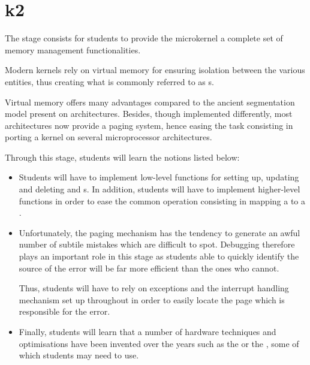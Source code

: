 %
%
%
%
%
%

%
%

\chapter{k2}
\label{chapter:k2}

The  stage consists for students to provide the microkernel a
complete set of memory management functionalities.

Modern kernels rely on virtual memory for ensuring isolation between the
various entities, thus creating what is commonly referred to as
s.

Virtual memory offers many advantages compared to the ancient segmentation
model present on  architectures. Besides, though implemented
differently, most architectures now provide a paging system, hence easing
the task consisting in porting a kernel on several microprocessor
architectures.

Through this stage, students will learn the notions listed below:

\begin{itemize}
  \item

    \-

    Students will have to implement low-level functions for setting up,
    updating and deleting  and
    s. In addition, students will have to
    implement higher-level functions in order to ease the common operation
    consisting in mapping a  to a .
  \item

    \-

    Unfortunately, the paging mechanism has the tendency to generate an
    awful number of subtile mistakes which are difficult to spot. Debugging
    therefore plays an important role in this stage as students able to
    quickly identify the source of the error will be far more efficient than
    the ones who cannot.

    \-

    Thus, students will have to rely on exceptions and the interrupt handling
    mechanism set up throughout  in order to easily locate the
    page which is responsible for the error.
  \item

    \-

    Finally, students will learn that a number of hardware techniques
    and optimisations have been invented over the years such as the
     or the , some of which
    students may need to use.
\end{itemize}

